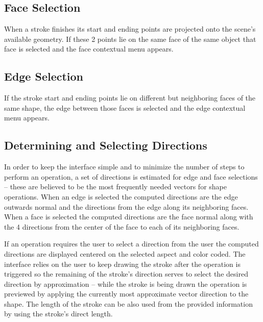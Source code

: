 
\subsection{Face Selection}

When a stroke finishes its start and ending points are projected onto the scene's available geometry.
If these 2 points lie on the same face of the same object that face is selected and the face contextual menu appears.



\subsection{Edge Selection}

If the stroke start and ending points lie on different but neighboring faces of the same shape, the edge between
those faces is selected and the edge contextual menu appears.



\subsection{Determining and Selecting Directions}

In order to keep the interface simple and to minimize the number of steps to perform an operation, a set of directions
is estimated for edge and face selections -- these are believed to be the most frequently needed vectors for shape operations.
When an edge is selected the computed directions are the edge outwards normal and the directions from the edge along its neighboring faces.
When a face is selected the computed directions are the face normal along with the 4 directions from the center of the face
to each of its neighboring faces.

If an operation requires the user to select a direction from the user the computed directions are displayed centered on the selected aspect
and color coded. The interface relies on the user to keep drawing the stroke after the operation is triggered so the remaining of the stroke's direction serves to select the desired direction by approximation -- while the stroke is being drawn the operation is previewed by applying the currently most approximate vector direction to the shape. The length of the stroke can be also used from the provided information by using the stroke's direct length.

